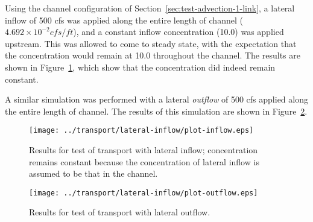 \documentclass[12pt,dvips,letterpaper]{article}
\begin{document}
Using the channel configuration of
Section~\ref{sec:test-advection-1-link}, a lateral inflow of 500 cfs
was applied along the entire length of channel ($4.692 \times 10^{-2}
cfs/ft$), and a constant inflow concentration (10.0) was applied
upstream.  This was allowed to come to steady state, with the
expectation that the concentration would remain at 10.0 throughout the
channel.  The results are shown in
Figure~\ref{fig:test-tranport-lateral-inflow}, which show that the
concentration did indeed remain constant. 

A similar simulation was performed with a lateral \textit{outflow} of
500 cfs applied along the entire length of channel.  The results of
this simulation are shown in
Figure~\ref{fig:test-tranport-lateral-outflow}.

\begin{figure}[htbp]
  \begin{center}
    \texttt{[image: ../transport/lateral-inflow/plot-inflow.eps]}
    \caption{Results for test of transport with lateral inflow;
      concentration remains constant because the concentration of
      lateral inflow is assumed to be that in the channel.} 
    \label{fig:test-tranport-lateral-inflow}
  \end{center}
\end{figure}

\begin{figure}[htbp]
  \begin{center}
    \texttt{[image: ../transport/lateral-inflow/plot-outflow.eps]}
    \caption{Results for test of transport with lateral outflow.} 
    \label{fig:test-tranport-lateral-outflow}
  \end{center}
\end{figure}





\end{document}
